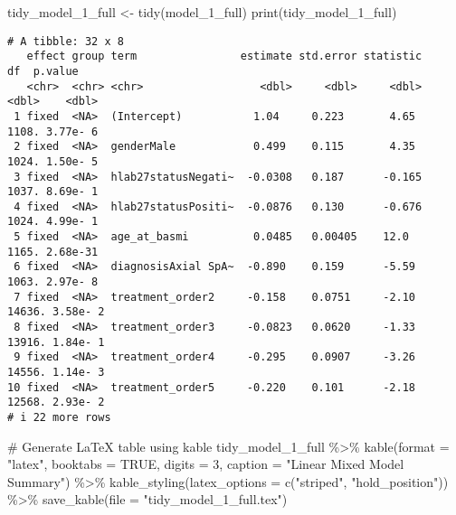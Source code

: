 \documentclass[
  letterpaper,
  DIV=11,
  numbers=noendperiod]{scrartcl}
\newenvironment{Shaded}{\begin{snugshade}}{\end{snugshade}}
\newcommand{\AttributeTok}[1]{\textcolor[rgb]{0.40,0.45,0.13}{#1}}
\newcommand{\CommentTok}[1]{\textcolor[rgb]{0.37,0.37,0.37}{#1}}
\newcommand{\ConstantTok}[1]{\textcolor[rgb]{0.56,0.35,0.01}{#1}}
\newcommand{\DecValTok}[1]{\textcolor[rgb]{0.68,0.00,0.00}{#1}}
\newcommand{\FunctionTok}[1]{\textcolor[rgb]{0.28,0.35,0.67}{#1}}
\newcommand{\NormalTok}[1]{\textcolor[rgb]{0.00,0.23,0.31}{#1}}
\newcommand{\OtherTok}[1]{\textcolor[rgb]{0.00,0.23,0.31}{#1}}
\newcommand{\SpecialCharTok}[1]{\textcolor[rgb]{0.37,0.37,0.37}{#1}}
\newcommand{\StringTok}[1]{\textcolor[rgb]{0.13,0.47,0.30}{#1}}
\begin{document}
\begin{Shaded}
\begin{Highlighting}[]
\NormalTok{tidy\_model\_1\_full }\OtherTok{\textless{}{-}} \FunctionTok{tidy}\NormalTok{(model\_1\_full)}
\FunctionTok{print}\NormalTok{(tidy\_model\_1\_full)}
\end{Highlighting}
\end{Shaded}

\begin{verbatim}
# A tibble: 32 x 8
   effect group term                estimate std.error statistic     df  p.value
   <chr>  <chr> <chr>                  <dbl>     <dbl>     <dbl>  <dbl>    <dbl>
 1 fixed  <NA>  (Intercept)           1.04     0.223       4.65   1108. 3.77e- 6
 2 fixed  <NA>  genderMale            0.499    0.115       4.35   1024. 1.50e- 5
 3 fixed  <NA>  hlab27statusNegati~  -0.0308   0.187      -0.165  1037. 8.69e- 1
 4 fixed  <NA>  hlab27statusPositi~  -0.0876   0.130      -0.676  1024. 4.99e- 1
 5 fixed  <NA>  age_at_basmi          0.0485   0.00405    12.0    1165. 2.68e-31
 6 fixed  <NA>  diagnosisAxial SpA~  -0.890    0.159      -5.59   1063. 2.97e- 8
 7 fixed  <NA>  treatment_order2     -0.158    0.0751     -2.10  14636. 3.58e- 2
 8 fixed  <NA>  treatment_order3     -0.0823   0.0620     -1.33  13916. 1.84e- 1
 9 fixed  <NA>  treatment_order4     -0.295    0.0907     -3.26  14556. 1.14e- 3
10 fixed  <NA>  treatment_order5     -0.220    0.101      -2.18  12568. 2.93e- 2
# i 22 more rows
\end{verbatim}

\begin{Shaded}
\begin{Highlighting}[]
\CommentTok{\# Generate LaTeX table using kable}
\NormalTok{tidy\_model\_1\_full }\SpecialCharTok{\%\textgreater{}\%}
  \FunctionTok{kable}\NormalTok{(}\AttributeTok{format =} \StringTok{"latex"}\NormalTok{, }\AttributeTok{booktabs =} \ConstantTok{TRUE}\NormalTok{, }\AttributeTok{digits =} \DecValTok{3}\NormalTok{, }\AttributeTok{caption =} \StringTok{"Linear Mixed Model Summary"}\NormalTok{) }\SpecialCharTok{\%\textgreater{}\%}
  \FunctionTok{kable\_styling}\NormalTok{(}\AttributeTok{latex\_options =} \FunctionTok{c}\NormalTok{(}\StringTok{"striped"}\NormalTok{, }\StringTok{"hold\_position"}\NormalTok{)) }\SpecialCharTok{\%\textgreater{}\%}
  \FunctionTok{save\_kable}\NormalTok{(}\AttributeTok{file =} \StringTok{"tidy\_model\_1\_full.tex"}\NormalTok{)}
\end{Highlighting}
\end{Shaded}
\end{document}
